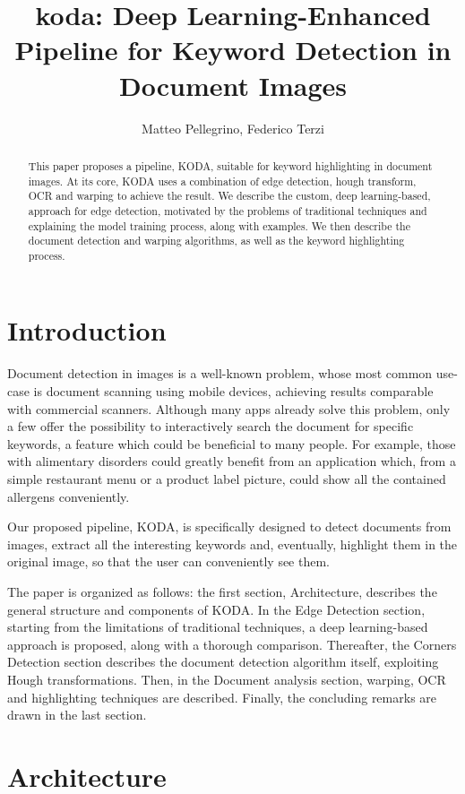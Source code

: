 \documentclass[a4paper]{article}
\title{koda: Deep Learning-Enhanced Pipeline for Keyword Detection in Document Images}
\author{Matteo Pellegrino, Federico Terzi}
\begin{document}
\maketitle

\begin{abstract}
This paper proposes a pipeline, KODA, suitable for keyword highlighting in document images. At its core, KODA uses a combination of edge detection, hough transform, OCR and warping to achieve the result. 
We describe the custom, deep learning-based, approach for edge detection, motivated by the problems of traditional techniques and explaining the model training process, along with examples.
We then describe the document detection and warping algorithms, as well as the keyword highlighting process.
\end{abstract}

\section{Introduction}
Document detection in images is a well-known problem, whose most common use-case is document scanning using mobile devices, achieving results comparable with commercial scanners. Although many apps already solve this problem, only a few offer the possibility to interactively search the document for specific keywords, a feature which could be beneficial to many people. For example, those with alimentary disorders could greatly benefit from an application which, from a simple restaurant menu or a product label picture, could show all the contained allergens conveniently.

Our proposed pipeline, KODA, is specifically designed to detect documents from images, extract all the interesting keywords and, eventually, highlight them in the original image, so that the user can conveniently see them.

The paper is organized as follows: the first section, Architecture, describes the general structure and components of KODA. In the Edge Detection section, starting from the limitations of traditional techniques, a deep learning-based approach is proposed, along with a thorough comparison. Thereafter, the Corners Detection section describes the document detection algorithm itself, exploiting Hough transformations. Then, in the Document analysis section, warping, OCR and highlighting techniques are described. Finally, the concluding remarks are drawn in the last section.

\section{Architecture}
\end{document}
